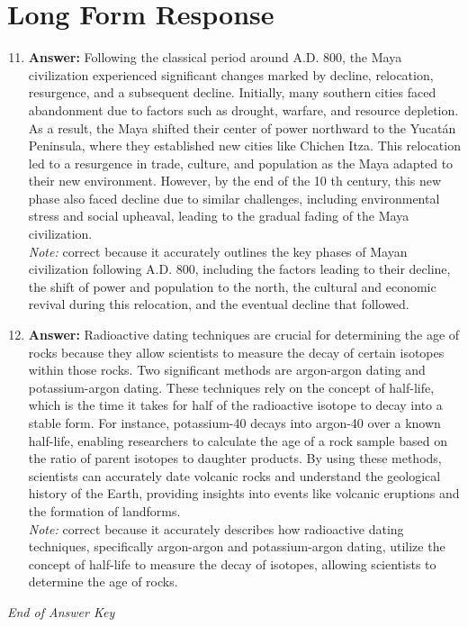 \documentclass[12pt]{article}
\begin{document}
\section*{Long Form Response}
\begin{enumerate}[label=\arabic*.]
\setcounter{enumi}{10}
\item \textbf{Answer:} Following the classical period around A.D. 800, the Maya civilization experienced significant changes marked by decline, relocation, resurgence, and a subsequent decline. Initially, many southern cities faced abandonment due to factors such as drought, warfare, and resource depletion. As a result, the Maya shifted their center of power northward to the Yucatán Peninsula, where they established new cities like Chichen Itza. This relocation led to a resurgence in trade, culture, and population as the Maya adapted to their new environment. However, by the end of the 10 th century, this new phase also faced decline due to similar challenges, including environmental stress and social upheaval, leading to the gradual fading of the Maya civilization.
\\ \textit{Note:} correct because it accurately outlines the key phases of Mayan civilization following A.D. 800, including the factors leading to their decline, the shift of power and population to the north, the cultural and economic revival during this relocation, and the eventual decline that followed.
\item \textbf{Answer:} Radioactive dating techniques are crucial for determining the age of rocks because they allow scientists to measure the decay of certain isotopes within those rocks. Two significant methods are argon-argon dating and potassium-argon dating. These techniques rely on the concept of half-life, which is the time it takes for half of the radioactive isotope to decay into a stable form. For instance, potassium-40 decays into argon-40 over a known half-life, enabling researchers to calculate the age of a rock sample based on the ratio of parent isotopes to daughter products. By using these methods, scientists can accurately date volcanic rocks and understand the geological history of the Earth, providing insights into events like volcanic eruptions and the formation of landforms.
\\ \textit{Note:} correct because it accurately describes how radioactive dating techniques, specifically argon-argon and potassium-argon dating, utilize the concept of half-life to measure the decay of isotopes, allowing scientists to determine the age of rocks.
\end{enumerate}

\vfill
\noindent\textit{End of Answer Key}
\end{document}
